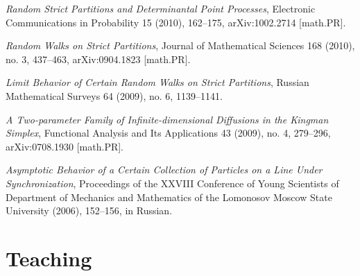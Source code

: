 \documentclass[letterpaper,11pt]{article}
\begin{document}
\begin{etaremune}
    \item \emph{Random Strict Partitions and Determinantal Point Processes}, Electronic Communications in Probability 15 (2010), 162--175, arXiv:1002.2714 [math.PR].
    \item  \emph{Random Walks on Strict Partitions}, Journal of Mathematical Sciences 168 (2010), no. 3, 437--463, arXiv:0904.1823 [math.PR].  
    \item  \emph{Limit Behavior of Certain Random Walks on Strict Partitions}, Russian Mathematical Surveys 64 (2009), no. 6, 1139--1141.
    \item  \emph{A Two-parameter Family of Infinite-dimensional Diffusions in the Kingman Simplex}, Functional Analysis and Its Applications 43 (2009), no. 4, 279--296, arXiv:0708.1930 [math.PR].
     \item 
    \emph{Asymptotic Behavior of a Certain Collection of Particles on a Line Under Synchronization}, Proceedings of the XXVIII Conference of Young Scientists of Department of Mechanics and Mathematics of the Lomonosov Moscow State University (2006), 152--156, in Russian.
\end{etaremune}



\section*{Teaching}
\end{document}
